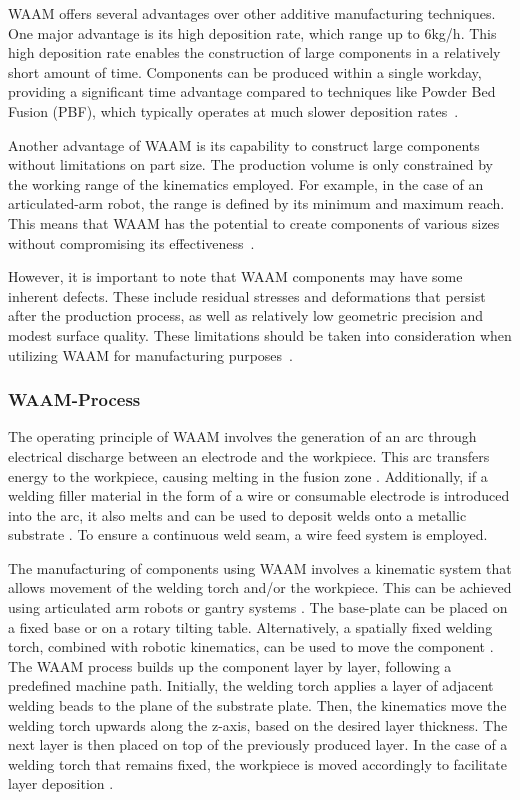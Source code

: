 WAAM offers several advantages over other additive manufacturing techniques. One major advantage is its high deposition rate, which range up to 6kg/h. This high deposition rate enables the construction of large components in a relatively short amount of time. Components can be produced within a single workday, providing a significant time advantage compared to techniques like Powder Bed Fusion (PBF), which typically operates at much slower deposition rates~\cite{IvanTabernero.2018}.

Another advantage of WAAM is its capability to construct large components without limitations on part size. The production volume is only constrained by the working range of the kinematics employed. For example, in the case of an articulated-arm robot, the range is defined by its minimum and maximum reach. This means that WAAM has the potential to create components of various sizes without compromising its effectiveness~\cite{Li.2019}.

However, it is important to note that WAAM components may have some inherent defects. These include residual stresses and deformations that persist after the production process, as well as relatively low geometric precision and modest surface quality. These limitations should be taken into consideration when utilizing WAAM for manufacturing purposes~\cite{Wu.2018}.

\subsubsection{WAAM-Process}
The operating principle of WAAM involves the generation of an arc through electrical discharge between an electrode and the workpiece. This arc transfers energy to the workpiece, causing melting in the fusion zone \cite{}. Additionally, if a welding filler material in the form of a wire or consumable electrode is introduced into the arc, it also melts and can be used to deposit welds onto a metallic substrate \cite{}. To ensure a continuous weld seam, a wire feed system is employed.

The manufacturing of components using WAAM involves a kinematic system that allows movement of the welding torch and/or the workpiece. This can be achieved using articulated arm robots or gantry systems \cite{}. The base-plate can be placed on a fixed base or on a rotary tilting table. Alternatively, a spatially fixed welding torch, combined with robotic kinematics, can be used to move the component \cite{}. The WAAM process builds up the component layer by layer, following a predefined machine path. Initially, the welding torch applies a layer of adjacent welding beads to the plane of the substrate plate. Then, the kinematics move the welding torch upwards along the z-axis, based on the desired layer thickness. The next layer is then placed on top of the previously produced layer. In the case of a welding torch that remains fixed, the workpiece is moved accordingly to facilitate layer deposition \cite{}.

